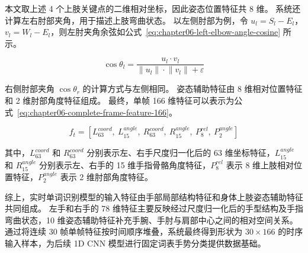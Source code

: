本文取上述 4 个上肢关键点的二维相对坐标，因此姿态位置特征共 8 维。
系统还计算左右肘部夹角，用于描述上肢弯曲状态。
以左侧肘部为例，令 $u_l=S_l-E_l$，$v_l=W_l-E_l$，则左肘夹角余弦如公式~\ref{eq:chapter06-left-elbow-angle-cosine} 所示。

\begin{equation}
\cos\theta_l = \frac{u_l \cdot v_l}{\lVert u_l\rVert \cdot \lVert v_l\rVert + \varepsilon}
\label{eq:chapter06-left-elbow-angle-cosine}
\end{equation}

右侧肘部夹角 $\cos\theta_r$ 的计算方式与左侧相同。
姿态辅助特征由 8 维相对位置特征和 2 维肘部角度特征组成。
最终，单帧 166 维特征可以表示为公式~\ref{eq:chapter06-complete-frame-feature-166}。

\begin{equation}
f_t = [L^{coord}_{63},\ L^{angle}_{15},\ R^{coord}_{63},\ R^{angle}_{15},\ P^{rel}_{8},\ P^{angle}_{2}]
\label{eq:chapter06-complete-frame-feature-166}
\end{equation}

其中，$L^{coord}_{63}$ 和 $R^{coord}_{63}$ 分别表示左、右手尺度归一化后的 63 维坐标特征，$L^{angle}_{15}$ 和 $R^{angle}_{15}$ 分别表示左、右手的 15 维手指骨骼角度特征，$P^{rel}_{8}$ 表示 8 维上肢相对位置特征，$P^{angle}_{2}$ 表示 2 维肘部角度特征。

综上，实时单词识别模型的输入特征由手部局部结构特征和身体上肢姿态辅助特征共同组成。
左手和右手的 78 维特征主要反映经过尺度归一化后的手型结构及手指弯曲状态，10 维姿态辅助特征补充手腕、手肘与肩部中心之间的相对空间关系。
通过将连续 30 帧单帧特征按时间顺序堆叠，系统最终得到形状为 $30\times166$ 的时序输入样本，为后续 1D CNN 模型进行固定词表手势分类提供数据基础。
